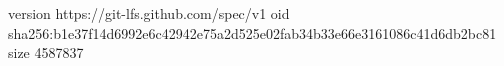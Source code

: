 version https://git-lfs.github.com/spec/v1
oid sha256:b1e37f14d6992e6c42942e75a2d525e02fab34b33e66e3161086c41d6db2bc81
size 4587837
